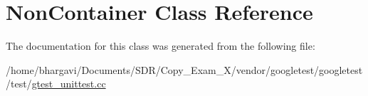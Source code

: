 \hypertarget{class_non_container}{}\section{Non\+Container Class Reference}
\label{class_non_container}


The documentation for this class was generated from the following file\+:\begin{DoxyCompactItemize}
\item 
/home/bhargavi/\+Documents/\+S\+D\+R/\+Copy\+\_\+\+Exam\+\_\+X/vendor/googletest/googletest/test/\hyperlink{gtest__unittest_8cc}{gtest\+\_\+unittest.\+cc}\end{DoxyCompactItemize}
